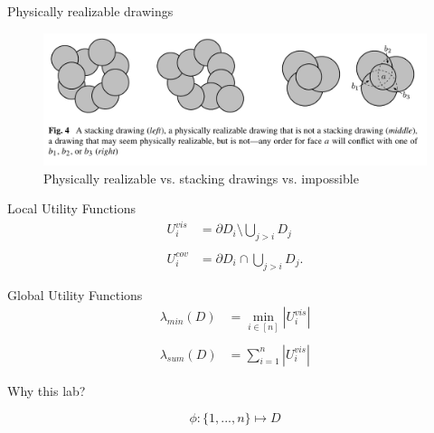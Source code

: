 \documentclass{beamer}
\begin{document}
\begin{frame}{Physically realizable drawings}
  \begin{figure}[!b]
    \centering
      \includegraphics[width=0.9\linewidth]{assets/cabello_drawings.png}
      \caption{Physically realizable vs. stacking drawings vs. impossible}
  \end{figure}
\end{frame}

\begin{frame}{Local Utility Functions}
\begin{align*}
  U_i^{vis} & =\partial D_i\setminus \bigcup_{j>i} D_{j} \\
  \\
  U_i^{cov} & =\partial D_i \cap \bigcup_{j>i} D_{j}.
\end{align*}
\end{frame}

\begin{frame}{Global Utility Functions}
\begin{align*}
  \lambda_{min} (D) & = \min_{i \in [n]}|U_i^{vis}| \\
  \\
  \lambda_{sum} (D) & = \sum_{i=1}^n|U_i^{vis}|
\end{align*}

\end{frame}

\begin{frame}{Why this lab?}

$$
\phi: \{1,...,n\} \mapsto D
$$

\end{frame}
\end{document}
